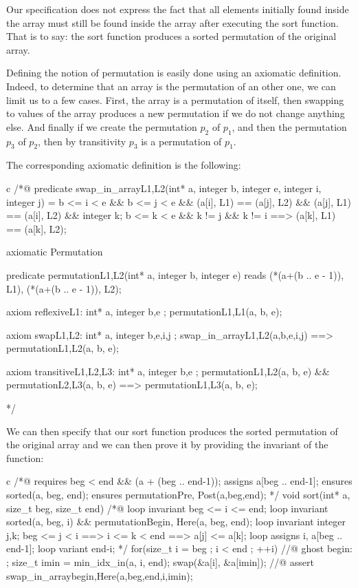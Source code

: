 \documentclass[middle]{zmdocument}
\begin{document}
Our specification does not express the fact that all elements initially
found inside the array must still be found inside the array after
executing the sort function. That is to say: the sort function produces
a sorted permutation of the original array.

Defining the notion of permutation is easily done using an axiomatic
definition. Indeed, to determine that an array is the permutation of an
other one, we can limit us to a few cases. First, the array is a
permutation of itself, then swapping to values of the array produces a
new permutation if we do not change anything else. And finally if we
create the permutation $p_2$ of $p_1$, and then the permutation
$p_3$ of $p_2$, then by transitivity $p_3$ is a permutation of
$p_1$.



The corresponding axiomatic definition is the following:



\begin{CodeBlock}{c}
/*@
  predicate swap_in_array{L1,L2}(int* a, integer b, integer e, integer i, integer j) =
    b <= i < e && b <= j < e &&
    \at(a[i], L1) == \at(a[j], L2) && \at(a[j], L1) == \at(a[i], L2) &&
    \forall integer k; b <= k < e && k != j && k != i ==> \at(a[k], L1) == \at(a[k], L2);

  axiomatic Permutation{
    predicate permutation{L1,L2}(int* a, integer b, integer e)
     reads \at(*(a+(b .. e - 1)), L1), \at(*(a+(b .. e - 1)), L2);

    axiom reflexive{L1}: 
      \forall int* a, integer b,e ; permutation{L1,L1}(a, b, e);

    axiom swap{L1,L2}:
      \forall int* a, integer b,e,i,j ;
        swap_in_array{L1,L2}(a,b,e,i,j) ==> permutation{L1,L2}(a, b, e);
	
    axiom transitive{L1,L2,L3}:
      \forall int* a, integer b,e ; 
        permutation{L1,L2}(a, b, e) && permutation{L2,L3}(a, b, e) ==> permutation{L1,L3}(a, b, e);
  }
*/
\end{CodeBlock}



We can then specify that our sort function produces the sorted
permutation of the original array and we can then prove it by providing
the invariant of the function:



\begin{CodeBlock}{c}
/*@
  requires beg < end && \valid(a + (beg .. end-1));
  assigns  a[beg .. end-1];  
  ensures sorted(a, beg, end);
  ensures permutation{Pre, Post}(a,beg,end);
*/
void sort(int* a, size_t beg, size_t end){
  /*@
    loop invariant beg <= i <= end;
    loop invariant sorted(a, beg, i) && permutation{Begin, Here}(a, beg, end);
    loop invariant \forall integer j,k; beg <= j < i ==> i <= k < end ==> a[j] <= a[k];
    loop assigns i, a[beg .. end-1];
    loop variant end-i;
  */
  for(size_t i = beg ; i < end ; ++i){
    //@ ghost begin: ;
    size_t imin = min_idx_in(a, i, end);
    swap(&a[i], &a[imin]);
    //@ assert swap_in_array{begin,Here}(a,beg,end,i,imin);
  }
}
\end{CodeBlock}
\end{document}
